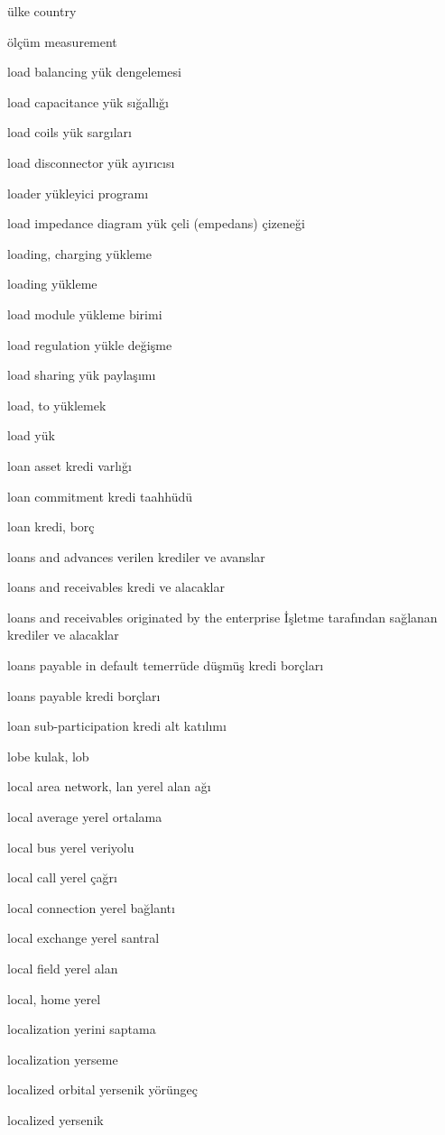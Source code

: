 \documentclass[12pt,fleqn]{article}\usepackage{../../common}
\begin{document}
ülke country

ölçüm measurement

load balancing yük dengelemesi

load capacitance yük sığallığı

load coils yük sargıları

load disconnector yük ayırıcısı

loader yükleyici programı

load impedance diagram yük çeli (empedans) çizeneği

loading, charging yükleme

loading yükleme

load module yükleme birimi

load regulation yükle değişme

load sharing yük paylaşımı

load, to yüklemek

load yük

loan asset kredi varlığı

loan commitment kredi taahhüdü

loan kredi, borç

loans and advances verilen krediler ve avanslar

loans and receivables kredi ve alacaklar

loans and receivables originated by the enterprise İşletme tarafından sağlanan krediler ve alacaklar

loans payable in default temerrüde düşmüş kredi borçları

loans payable kredi borçları

loan sub-participation kredi alt katılımı

lobe kulak, lob

local area network, lan yerel alan ağı

local average yerel ortalama

local bus yerel veriyolu

local call yerel çağrı

local connection yerel bağlantı

local exchange yerel santral

local field yerel alan

local, home yerel

localization yerini saptama

localization yerseme

localized orbital yersenik yörüngeç

localized yersenik
\end{document}
